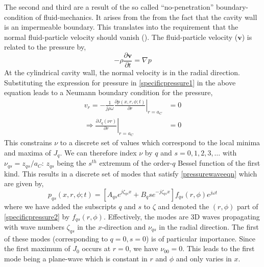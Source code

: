 The second and third are a result of the so called ``no-penetration'' boundary-condition
of fluid-mechanics. It arises from the from the fact that the cavity wall is an impermeable boundary. This translates 
into the requirement that the normal fluid-particle velocity should vanish (\cite[p.~111]{pozrikidisFluid}).
The fluid-particle velocity ($\mathbf{v}$) is related to the pressure by, 
\begin{equation}\label{pressurevelocityrelation}
 -\rho\frac{\partial \mathbf{v}}{\partial t}=\nabla p
\end{equation}
At the cylindrical cavity wall, the normal velocity is in the radial direction.
Substituting the expression for pressure in \eqref{specificpressure1} in the above equation leads to
a Neumann boundary condition for the pressure,
\begin{align}\label{radialnopenetration}
 v_r=-\left.\frac{1}{j\rho\omega}\frac{\partial p(x,r,\phi;t)}{\partial r}\right\vert_{r=a_C}&=0\nonumber\\
    \Rightarrow\left.\frac{\partial J_q (\nu r)}{\partial r}\right\vert_{r=a_C}&=0
\end{align}
This constrains $\nu$ to a discrete set of values which correspond to the local minima and maxima
of $J_q$. We can therefore index $\nu$ by $q$ and $s=0,1,2,3,\ldots$ with $\nu_{qs}=z_{qs}/a_C$:
$z_{qs}$ being the $s^{th}$ extremum of the order-$q$ Bessel function of the first kind.
This results in a discrete set of modes that satisfy \eqref{pressurewaveeqn} which are given
by,
\begin{equation}\label{specificpressure3}
 p_{qs}(x,r,\phi;t)=\left[A_{qs}e^{j\zeta_{qs}x}+B_q{s}e^{-j\zeta_{qs}x}\right]f_{qs}(r,\phi)e^{j\omega t}
\end{equation}
where we have added the subscripts $q$ and $s$ to $\zeta$ and denoted the $(r,\phi)$ part of \eqref{specificpressure2}
by $f_{qs}(r,\phi)$. Effectively, the
modes are 3D waves propagating with wave numbers $\zeta_{qs}$ in the $x$-direction and $\nu_{qs}$ in the radial
direction. The first of these modes (corresponding to $q=0,s=0$) is of particular importance. Since the first
maximum of $J_0$ occurs at $r=0$, we have $\nu_{00}=0$. This leads to the first mode being a plane-wave which
is constant in $r$ and $\phi$ and only varies in $x$. 

